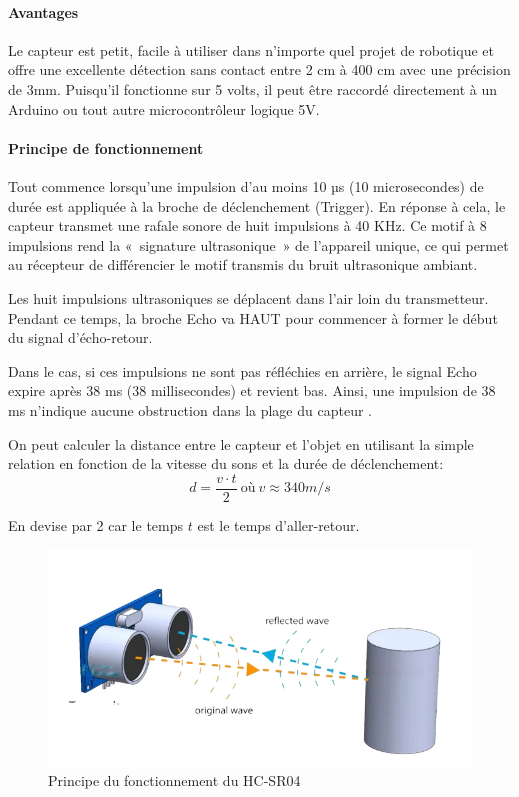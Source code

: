 \paragraph{Avantages}
Le capteur est petit, facile à utiliser dans n’importe quel projet de robotique et offre une excellente détection sans contact entre 2 cm à 400 cm avec une précision de 3mm. Puisqu’il fonctionne sur 5 volts, il peut être raccordé directement à un Arduino ou tout autre microcontrôleur logique 5V.

\paragraph{Principe de fonctionnement}
\label{hc-sr04:fonctionnement}
Tout commence lorsqu’une impulsion d’au moins 10 µs (10 microsecondes) de durée est appliquée à la broche de déclenchement (Trigger). En réponse à cela, le capteur transmet une rafale sonore de huit impulsions à 40 KHz. Ce motif à 8 impulsions rend la « signature ultrasonique » de l’appareil unique, ce qui permet au récepteur de différencier le motif transmis du bruit ultrasonique ambiant.

Les huit impulsions ultrasoniques se déplacent dans l’air loin du transmetteur. Pendant ce temps, la broche Echo va HAUT pour commencer à former le début du signal d’écho-retour.

Dans le cas, si ces impulsions ne sont pas réfléchies en arrière, le signal Echo expire après 38 ms (38 millisecondes) et revient bas. Ainsi, une impulsion de 38 ms n’indique aucune obstruction dans la plage du capteur \cite{hcsr04}.

On peut calculer la distance entre le capteur et l'objet en utilisant la simple relation en fonction de la vitesse du sons et la durée de déclenchement: \[d=\frac{v \cdot t}{2} \ \text{où} \ v \approx 340 m/s\]

En devise par 2 car le temps \(t\) est le temps d'aller-retour.


\begin{figure}[hbt!]
    \centering
    \includegraphics[width=14cm]{assets/HC-SR04/principe 3d.png}
    \caption{Principe du fonctionnement du HC-SR04}
\end{figure}

